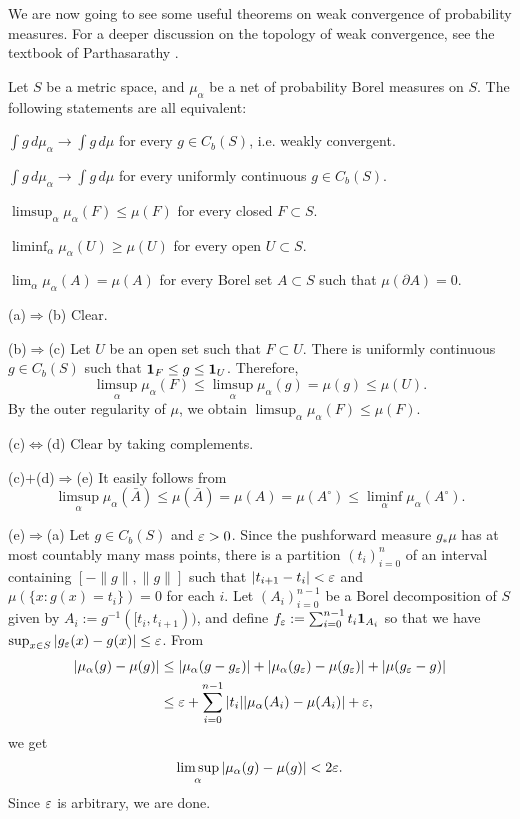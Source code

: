 \documentclass[a4paper]{article}
\begin{document}
We are now going to see some useful theorems on weak convergence of probability measures.
For a deeper discussion on the topology of weak convergence, see the textbook of Parthasarathy \cite{parthasarathy2005probability}.

\begin{lem}
Let $S$ be a metric space, and $\mu_\alpha$ be a net of probability Borel measures on $S$.
The following statements are all equivalent:
\begin{parts}
\item $\int g\,d\mu_\alpha\to\int g\,d\mu$ for every $g\in C_b(S)$, i.e. weakly convergent.
\item $\int g\,d\mu_\alpha\to\int g\,d\mu$ for every uniformly continuous $g\in C_b(S)$.
\item $\limsup_{\alpha}\mu_\alpha(F)\le\mu(F)$ for every closed $F\subset S$.
\item $\liminf_{\alpha}\mu_\alpha(U)\ge\mu(U)$ for every open $U\subset S$.
\item $\lim_{\alpha}\mu_\alpha(A)=\mu(A)$ for every Borel set $A\subset S$ such that $\mu(\partial A)=0$.
\end{parts}
\end{lem}
\begin{pf}
(a)$\Rightarrow$(b)
Clear.

(b)$\Rightarrow$(c)
Let $U$ be an open set such that $F\subset U$.
There is uniformly continuous $g\in C_b(S)$ such that $\mathbf{1}_F\le g\le\mathbf{1}_U$.
Therefore,
\[\limsup_\alpha\mu_\alpha(F)\le\limsup_\alpha\mu_\alpha(g)=\mu(g)\le\mu(U).\]
By the outer regularity of $\mu$, we obtain $\limsup_\alpha\mu_\alpha(F)\le\mu(F)$.

(c)$\Leftrightarrow$(d)
Clear by taking complements.

(c)$+$(d)$\Rightarrow$(e)
It easily follows from
\[\limsup_\alpha\mu_\alpha(\bar A)\le\mu(\bar A)=\mu(A)=\mu(A^\circ)\le\liminf_\alpha\mu_\alpha(A^\circ).\]

(e)$\Rightarrow$(a)
Let $g\in C_b(S)$ and $\varepsilon>0$.
Since the pushforward measure $g_*\mu$ has at most countably many mass points, there is a partition $(t_i)_{i=0}^n$ of an interval containing $[-\|g\|,\|g\|]$ such that $|t_{i+1}-t_i|<\varepsilon$ and $\mu(\{x:g(x)=t_i\})=0$ for each $i$.
Let $(A_i)_{i=0}^{n-1}$ be a Borel decomposition of $S$ given by $A_i:=g^{-1}([t_i,t_{i+1}))$, and define $f_\varepsilon:=\sum_{i=0}^{n-1}t_i\mathbf{1}_{A_i}$ so that we have $\sup_{x\in S}|g_\varepsilon(x)-g(x)|\le\varepsilon$.
From
\begin{align*}
|\mu_\alpha(g)-\mu(g)|&\le|\mu_\alpha(g-g_\varepsilon)|+|\mu_\alpha(g_\varepsilon)-\mu(g_\varepsilon)|+|\mu(g_\varepsilon-g)|\\
&\le\varepsilon+\sum_{i=0}^{n-1}|t_i||\mu_\alpha(A_i)-\mu(A_i)|+\varepsilon,
\end{align*}
we get
\[\limsup_\alpha|\mu_\alpha(g)-\mu(g)|<2\varepsilon.\]
Since $\varepsilon$ is arbitrary, we are done.
\end{pf}
\end{document}
